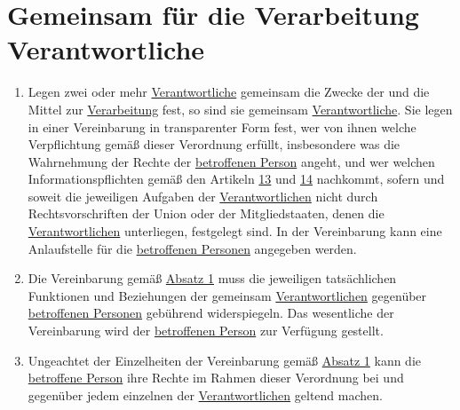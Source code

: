 \chapter{Gemeinsam für die Verarbeitung Verantwortliche}
\label{ch:26}


\begin{enumerate}

  \item Legen zwei oder mehr \hyperref[itm:04-7]{Verantwortliche} gemeinsam die Zwecke der und die Mittel zur \hyperref[itm:04-2]{Verarbeitung} fest, so sind sie
   gemeinsam \hyperref[itm:04-7]{Verantwortliche}. Sie legen in einer Vereinbarung in transparenter Form fest, wer von ihnen welche
   Verpflichtung gemäß dieser Verordnung erfüllt, insbesondere was die Wahrnehmung der Rechte der \hyperref[itm:04-1]{betroffenen Person}
   angeht, und wer welchen Informationspflichten gemäß den Artikeln \hyperref[ch:13]{13} und \hyperref[ch:14]
   {14} nachkommt, sofern und soweit die jeweiligen Aufgaben der \hyperref[itm:04-7]{Verantwortlichen} nicht durch Rechtsvorschriften der
   Union oder der Mitgliedstaaten, denen die \hyperref[itm:04-7]{Verantwortlichen} unterliegen, festgelegt sind. In der Vereinbarung kann
   eine Anlaufstelle für die \hyperref[itm:04-1]{betroffenen Personen} angegeben werden.
  \label{itm:26-1}

  \item Die Vereinbarung gemäß \hyperref[itm:26-1]{Absatz 1} muss die jeweiligen tatsächlichen Funktionen und
   Beziehungen der gemeinsam \hyperref[itm:04-7]{Verantwortlichen} gegenüber \hyperref[itm:04-1]{betroffenen Personen} gebührend widerspiegeln. Das wesentliche
   der Vereinbarung wird der \hyperref[itm:04-1]{betroffenen Person} zur Verfügung gestellt.
  \label{itm:26-2}

  \item Ungeachtet der Einzelheiten der Vereinbarung gemäß \hyperref[itm:26-1]{Absatz 1} kann die \hyperref[itm:04-1]{betroffene Person} ihre
   Rechte im Rahmen dieser Verordnung bei und gegenüber jedem einzelnen der \hyperref[itm:04-7]{Verantwortlichen} geltend machen.
  \label{itm:26-3}

\end{enumerate}


